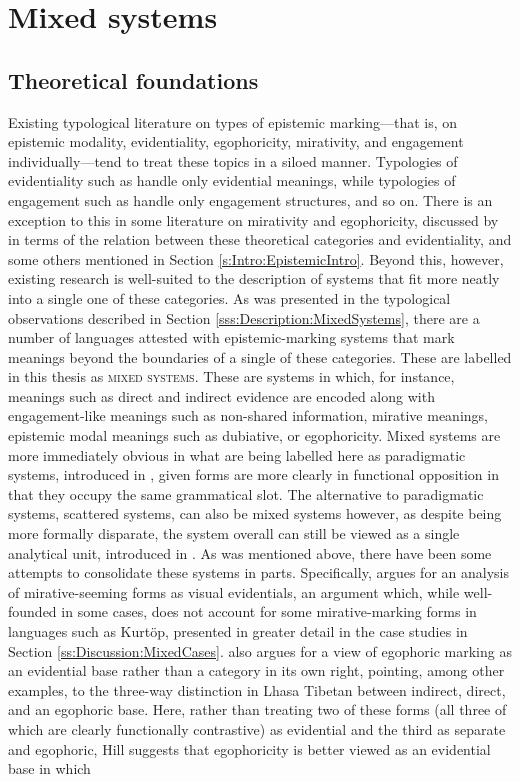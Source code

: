 \section{Mixed systems}\label{s:Discussion:Mixed}
\subsection{Theoretical foundations}\label{ss:Discussion:MixedFoundation}
Existing typological literature on types of epistemic marking---that is, on epistemic modality, evidentiality, egophoricity, mirativity, and engagement individually---tend to treat these topics in a siloed manner. Typologies of evidentiality such as  handle only evidential meanings, while typologies of engagement such as  handle only engagement structures, and so on. There is an exception to this in some literature on mirativity and egophoricity, discussed by  in terms of the relation between these theoretical categories and evidentiality, and some others mentioned in Section \ref{s:Intro:EpistemicIntro}. Beyond this, however, existing research is well-suited to the description of systems that fit more neatly into a single one of these categories. As was presented in the typological observations described in Section \ref{sss:Description:MixedSystems}, there are a number of languages attested with epistemic-marking systems that mark meanings beyond the boundaries of a single of these categories. These are labelled in this thesis as \textsc{mixed systems}. These are systems in which, for instance, meanings such as direct and indirect evidence are encoded along with engagement-like meanings such as non-shared information, mirative meanings, epistemic modal meanings such as dubiative, or egophoricity. Mixed systems are more immediately obvious in what are being labelled here as paradigmatic systems, introduced in , given forms are more clearly in functional opposition in that they occupy the same grammatical slot. The alternative to paradigmatic systems, scattered systems, can also be mixed systems however, as despite being more formally disparate, the system overall can still be viewed as a single analytical unit, introduced in . As was mentioned above, there have been some attempts to consolidate these systems in parts. Specifically,  argues for an analysis of mirative-seeming forms as visual evidentials, an argument which, while well-founded in some cases, does not account for some mirative-marking forms in languages such as Kurtöp, presented in greater detail in the case studies in Section \ref{ss:Discussion:MixedCases}.  also argues for a view of egophoric marking as an evidential base rather than a category in its own right, pointing, among other examples, to the three-way distinction in Lhasa Tibetan between indirect, direct, and an egophoric base. Here, rather than treating two of these forms (all three of which are clearly functionally contrastive) as evidential and the third as separate and egophoric, Hill suggests that egophoricity is better viewed as an evidential base in which 